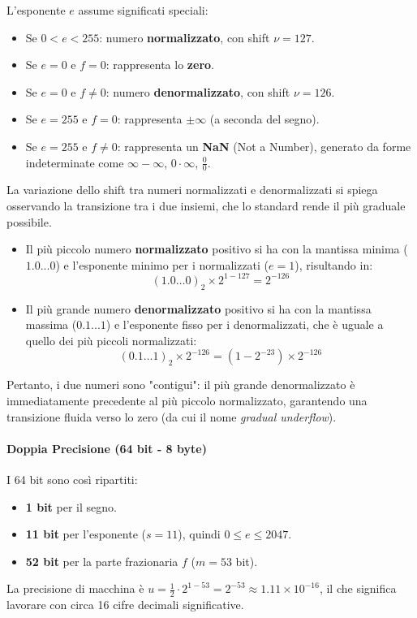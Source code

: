 L'esponente $e$ assume significati speciali:
\begin{itemize}
    \item Se $0 < e < 255$: numero \textbf{normalizzato}, con shift $\nu = 127$.
    \item Se $e=0$ e $f=0$: rappresenta lo \textbf{zero}.
    \item Se $e=0$ e $f \neq 0$: numero \textbf{denormalizzato}, con shift $\nu = 126$.
    \item Se $e=255$ e $f=0$: rappresenta $\pm\infty$ (a seconda del segno).
    \item Se $e=255$ e $f \neq 0$: rappresenta un \textbf{NaN} (Not a Number), generato da forme indeterminate come $\infty-\infty$, $0 \cdot \infty$, $\frac{0}{0}$.
\end{itemize}

\begin{osservazione}
    La variazione dello shift tra numeri normalizzati e denormalizzati si spiega osservando la transizione tra i due insiemi, che lo standard rende il più graduale possibile.
    \begin{itemize}
        \item Il più piccolo numero \textbf{normalizzato} positivo si ha con la mantissa minima ($1.0...0$) e l'esponente minimo per i normalizzati ($e=1$), risultando in:
        $$(1.0\dots0)_2 \times 2^{1-127} = 2^{-126}$$
    
        \item Il più grande numero \textbf{denormalizzato} positivo si ha con la mantissa massima ($0.1...1$) e l'esponente fisso per i denormalizzati, che è uguale a quello dei più piccoli normalizzati:
        $$(0.1\dots1)_2 \times 2^{-126} = (1 - 2^{-23}) \times 2^{-126}$$
    \end{itemize}
    Pertanto, i due numeri sono "contigui": il più grande denormalizzato è immediatamente precedente al più piccolo normalizzato, garantendo una transizione fluida verso lo zero (da cui il nome \emph{gradual underflow}).
    \end{osservazione}

\paragraph{Doppia Precisione (64 bit - 8 byte)}
I 64 bit sono così ripartiti:
\begin{itemize}
    \item \textbf{1 bit} per il segno.
    \item \textbf{11 bit} per l'esponente ($s=11$), quindi $0 \le e \le 2047$.
    \item \textbf{52 bit} per la parte frazionaria $f$ ($m=53$ bit).
\end{itemize}
La precisione di macchina è $u = \frac{1}{2} \cdot 2^{1-53} = 2^{-53} \approx 1.11 \times 10^{-16}$, il che significa lavorare con circa 16 cifre decimali significative.

